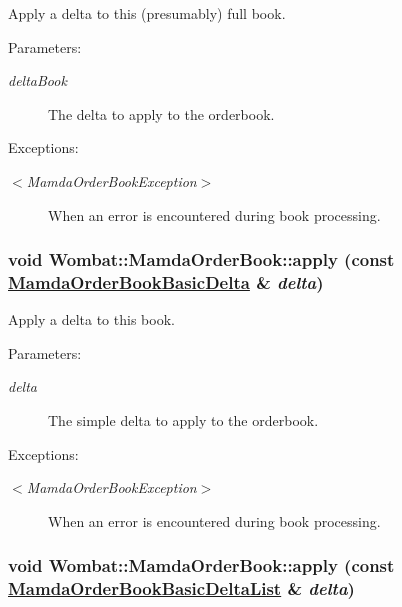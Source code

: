 Apply a delta to this (presumably) full book. 

\begin{Desc}
\item[Parameters:]
\begin{description}
\item[{\em delta\-Book}]The delta to apply to the orderbook.\end{description}
\end{Desc}
\begin{Desc}
\item[Exceptions:]
\begin{description}
\item[{\em $<$Mamda\-Order\-Book\-Exception$>$}]When an error is encountered during book processing. \end{description}
\end{Desc}
\hypertarget{classWombat_1_1MamdaOrderBook_e42ecb8f8d3eb5a0b213379515ac3805}{
\subsubsection[apply]{\setlength{\rightskip}{0pt plus 5cm}void Wombat::Mamda\-Order\-Book::apply (const \hyperlink{classWombat_1_1MamdaOrderBookBasicDelta}{Mamda\-Order\-Book\-Basic\-Delta} \& {\em delta})}}
\label{classWombat_1_1MamdaOrderBook_e42ecb8f8d3eb5a0b213379515ac3805}


Apply a delta to this book. 

\begin{Desc}
\item[Parameters:]
\begin{description}
\item[{\em delta}]The simple delta to apply to the orderbook.\end{description}
\end{Desc}
\begin{Desc}
\item[Exceptions:]
\begin{description}
\item[{\em $<$Mamda\-Order\-Book\-Exception$>$}]When an error is encountered during book processing. \end{description}
\end{Desc}
\hypertarget{classWombat_1_1MamdaOrderBook_a3925803c4f122b7b26145bffccbc39b}{
\subsubsection[apply]{\setlength{\rightskip}{0pt plus 5cm}void Wombat::Mamda\-Order\-Book::apply (const \hyperlink{classWombat_1_1MamdaOrderBookBasicDeltaList}{Mamda\-Order\-Book\-Basic\-Delta\-List} \& {\em delta})}}
\label{classWombat_1_1MamdaOrderBook_a3925803c4f122b7b26145bffccbc39b}



